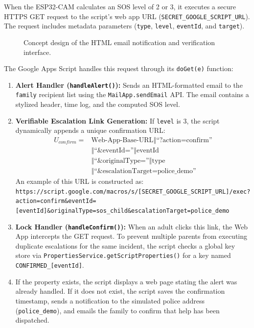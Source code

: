 \documentclass[conference]{IEEEtran}
\begin{document}
When the ESP32-CAM calculates an SOS level of 2 or 3, it executes a secure HTTPS GET request to the script's web app URL (\texttt{SECRET\_GOOGLE\_SCRIPT\_URL}). The request includes metadata parameters (\texttt{type}, \texttt{level}, \texttt{eventId}, and \texttt{target}).

\begin{figure}[!t]
\centering
{}
\caption{Concept design of the HTML email notification and verification interface.}
\label{fig:email_ui}
\end{figure}

The Google Apps Script handles this request through its \texttt{doGet(e)} function:
\begin{enumerate}
    \item \textbf{Alert Handler (\texttt{handleAlert()}):} Sends an HTML-formatted email to the \texttt{family} recipient list using the \texttt{MailApp.sendEmail} API. The email contains a stylized header, time log, and the computed SOS level.
    \item \textbf{Verifiable Escalation Link Generation:} If \texttt{level} is 3, the script dynamically appends a unique confirmation URL:
    \begin{align*}
    U_{confirm} = & \text{Web-App-Base-URL} \mathbin{\Vert} \text{``?action=confirm''} \\
    & \mathbin{\Vert} \text{``\&eventId=''} \mathbin{\Vert} \text{eventId} \\
    & \mathbin{\Vert} \text{``\&originalType=''} \mathbin{\Vert} \text{type} \\
    & \mathbin{\Vert} \text{``\&escalationTarget=police\_demo''}
    \end{align*}
    An example of this URL is constructed as: \texttt{https://script.google.com/macros/s/[SECRET\_GOOGLE\_SCRIPT\_URL]/exec?action=confirm\&eventId=[eventId]\&originalType=sos\_child\&escalationTarget=police\_demo}
    \item \textbf{Lock Handler (\texttt{handleConfirm()}):} When an adult clicks this link, the Web App intercepts the GET request. To prevent multiple parents from executing duplicate escalations for the same incident, the script checks a global key store via \texttt{PropertiesService.getScriptProperties()} for a key named \texttt{CONFIRMED\_[eventId]}.
    \item If the property exists, the script displays a web page stating the alert was already handled. If it does not exist, the script saves the confirmation timestamp, sends a notification to the simulated police address (\texttt{police\_demo}), and emails the family to confirm that help has been dispatched.
\end{enumerate}
\end{document}
